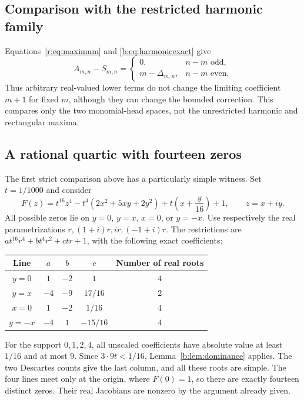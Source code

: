 \documentclass[UTF8,11pt]{ctexart}
\theoremstyle{definition}
\numberwithin{equation}{section}
\begin{document}
\subsection{Comparison with the restricted harmonic family}\label{r:sec:harmonic}
Equations~\eqref{r:eq:maximum} and \eqref{b:eq:harmonicexact} give
\[
 A_{m,n}-S_{m,n}=\begin{cases}0,&n-m\text{ odd},\\
 m-\Delta_{m,n},&n-m\text{ even}.\end{cases}
\]
Thus arbitrary real-valued lower terms do not change the limiting
coefficient $m+1$ for fixed $m$, although they can change the bounded
correction. This compares only the two monomial-head spaces, not the
unrestricted harmonic and rectangular maxima.
\subsection{A rational quartic with fourteen zeros}\label{r:sec:example}

The first strict comparison above has a particularly simple witness.
Set $t=1/1000$ and consider
\begin{equation}\label{r:eq:quartic}
 F(z)=t^{16}z^4-t^4(2x^2+5xy+2y^2)
       +t\left(x+\frac{y}{16}\right)+1,\qquad z=x+iy.
\end{equation}
All possible zeros lie on $y=0$, $y=x$, $x=0$, or $y=-x$.
Use respectively the real parametrizations
$r,(1+i)r,ir,(-1+i)r$. The restrictions are
$at^{16}r^4+bt^4r^2+ctr+1$, with the following exact coefficients:
\begin{center}
\begin{tabular}{ccccc}
\toprule
Line &$a$&$b$&$c$&Number of real roots\\
\midrule
$y=0$&$1$&$-2$&$1$&$4$\\
$y=x$&$-4$&$-9$&$17/16$&$2$\\
$x=0$&$1$&$-2$&$1/16$&$4$\\
$y=-x$&$-4$&$1$&$-15/16$&$4$\\
\bottomrule
\end{tabular}
\end{center}
For the support $0,1,2,4$, all unscaled coefficients have absolute
value at least $1/16$ and at most $9$. Since $3\cdot9t<1/16$,
Lemma~\ref{b:lem:dominance} applies. The two Descartes counts give the
last column, and all these roots are simple. The four lines meet only
at the origin, where $F(0)=1$, so there are exactly fourteen distinct
zeros. Their real Jacobians are nonzero by the argument already given.
\end{document}

